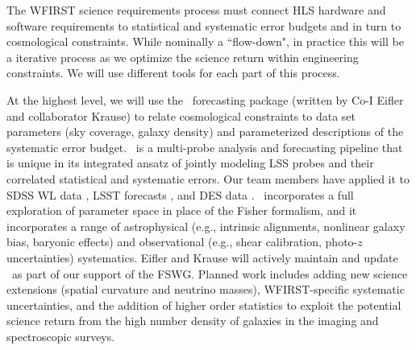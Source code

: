 %
%

The WFIRST science requirements process must 
connect 
HLS hardware and software requirements to statistical and systematic error budgets and in turn to  cosmological constraints. While nominally a ``flow-down",  in practice this will be a iterative process as we optimize the science return within engineering  constraints. We will use different tools for each part of this process. 

At the highest level, we will use the \CoLi\ forecasting package (written 
by Co-I Eifler and collaborator Krause) %
to relate cosmological constraints to data set parameters (sky coverage, galaxy density) and parameterized descriptions of the systematic error budget. 
\CoLi\ is a multi-probe analysis and forecasting pipeline that is unique in its integrated ansatz of jointly modeling LSS probes and their correlated statistical 
and systematic errors. Our team members have  applied it to SDSS WL data
\cite{Huff2014}, LSST forecasts \cite{Krause2015}, and DES data
\cite{Becker2015, DES2015}. \CoLi\ incorporates a full exploration of parameter space in place of the Fisher formalism, and it incorporates
a range of astrophysical (e.g., intrinsic alignments, nonlinear galaxy bias, 
baryonic effects)
and observational (e.g., shear calibration, photo-$z$ uncertainties) 
systematics. 
Eifler and Krause will actively maintain and
update \CoLi\ as part of our support of the FSWG.  Planned work includes adding new science extensions (spatial 
curvature and neutrino masses), WFIRST-specific systematic uncertainties, and the addition of higher order statistics to exploit the potential science return from the high number density of galaxies
in the imaging and spectroscopic surveys.


